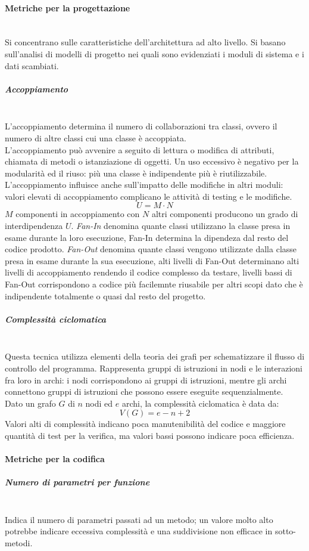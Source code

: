 \paragraph{Metriche per la progettazione}\mbox{}\\
Si concentrano sulle caratteristiche dell'architettura ad alto livello. Si basano sull'analisi di modelli di progetto nei quali sono evidenziati i moduli di sistema e i dati scambiati.

\subparagraph{Accoppiamento}\mbox{}\\
L'accoppiamento determina il numero di collaborazioni tra classi, ovvero il numero di altre classi cui una classe è accoppiata.\\
L'accoppiamento può avvenire a seguito di lettura o modifica di attributi, chiamata di metodi o istanziazione di oggetti. Un uso eccessivo è negativo per la modularità ed il riuso: più una classe è indipendente più è riutilizzabile. L'accoppiamento influisce anche sull'impatto delle modifiche in altri moduli: valori elevati di accoppiamento complicano le attività di testing e le modifiche.
\[ U = M \cdot N \]
$M$ componenti in accoppiamento con $N$ altri componenti producono un grado di interdipendenza $U$.
\textit{Fan-In} denomina quante classi utilizzano la classe presa in esame durante la loro esecuzione, Fan-In determina la dipendeza dal resto del codice prodotto. 
\textit{Fan-Out} denomina quante classi vengono utilizzate dalla classe presa in esame durante la sua esecuzione, alti livelli di Fan-Out determinano alti livelli di accoppiamento rendendo il codice complesso da testare, livelli bassi di Fan-Out corrispondono a codice più facilemnte riusabile per altri scopi dato che è indipendente totalmente o quasi dal resto del progetto.

\subparagraph{Complessità ciclomatica}\mbox{}\\
Questa tecnica utilizza elementi della teoria dei grafi per schematizzare il flusso di controllo del programma. Rappresenta gruppi di istruzioni in nodi e le interazioni fra loro in archi: i nodi corrispondono ai gruppi di istruzioni, mentre gli archi connettono gruppi di istruzioni che possono essere eseguite sequenzialmente.\\
Dato un grafo $G$ di $n$ nodi ed $e$ archi, la complessità ciclomatica è data da:
\[ V\left(G\right) = e - n + 2 \]
Valori alti di complessità indicano poca manutenibilità del codice e maggiore quantità di test per la verifica, ma valori bassi possono indicare poca efficienza.

\paragraph{Metriche per la codifica}\mbox{}
\subparagraph{Numero di parametri per funzione}\mbox{}\\
Indica il numero di parametri passati ad un metodo; un valore molto alto potrebbe indicare eccessiva complessità e una suddivisione non efficace in sotto-metodi.

